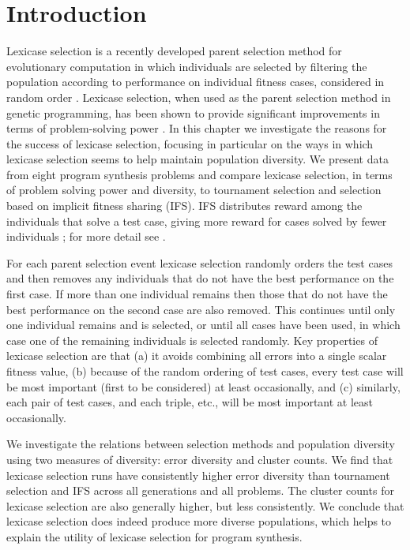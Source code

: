 \section{Introduction} \label{intro}

Lexicase selection is a recently developed parent selection method for  evolutionary computation in which individuals are selected by 
filtering the population according to performance on individual fitness cases, considered in random order \citep{Spector:2012:GECCOcompANEW}. Lexicase 
selection, when used as the parent selection method in genetic programming, has been shown to provide 
significant improvements in terms of problem-solving power \citep{Helmuth:2014:ieeeTEC, Helmuth:2015:GECCO}. 
In this chapter we investigate the reasons for the success of lexicase selection, focusing in particular on the 
ways in which lexicase selection seems to help maintain population diversity. We present data from eight 
program synthesis problems and compare lexicase selection, in terms of problem solving power and diversity, 
to tournament selection and selection based on implicit fitness sharing (IFS). IFS distributes reward among the individuals that solve a test case, giving more reward for cases solved by fewer individuals \citep{Mckay00fitnesssharing}; for more detail see \citep{Helmuth:2014:ieeeTEC}.

For each parent selection event lexicase selection randomly orders the test cases and then removes any individuals  
that do not have the best performance on the first case. 
If more than one individual remains then those that do not have the best performance on the second case are also removed. This 
 continues until only one individual remains and is selected, or until all cases 
have been used, in which case one of the remaining individuals is selected randomly.
Key properties of lexicase selection are that (a) it avoids combining all  errors into a single scalar fitness
 value, (b) because of the random ordering of test cases, every test case will be
most important (first to be considered) at least occasionally, and (c) similarly, each pair of test cases, and each triple, etc., will be most important at least occasionally. 


We investigate the relations between selection methods and population diversity using two measures of  diversity: 
error diversity and cluster counts. We find that lexicase selection runs have consistently 
higher error diversity than tournament selection and IFS across all generations and all problems. The cluster 
counts for lexicase selection are also generally higher, but less consistently. We conclude that lexicase selection does indeed produce more diverse populations, which helps to explain 
the utility of lexicase selection for program synthesis.

